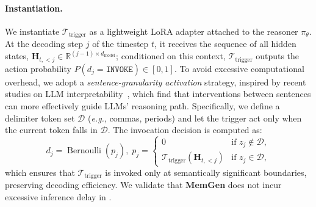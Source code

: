 \documentclass[]{fairmeta}
\newcommand{\ourmethod}{{\fontfamily{lmtt}\selectfont \textbf{MemGen}}\xspace}
\begin{document}
\paragraph{Instantiation.}  
We instantiate $\mathcal{T}_\text{trigger}$ as a lightweight LoRA adapter attached to the reasoner $\pi_\theta$. At the decoding step $j$ of the timestep $t$, it receives the sequence of all hidden states, $\mathbf{H}_{t,<j} \in \mathbb{R}^{(j-1) \times d_\text{model}}$; conditioned on this context, $\mathcal{T}_\text{trigger}$ outputs the action probability $
 P(d_j = \texttt{INVOKE}) \in [0,1].$
To avoid excessive computational overhead, we adopt a \textit{sentence-granularity activation} strategy, inspired by recent studies on LLM interpretability~\citep{transformercircuitsBiologyLarge,chen2024sepllm}, which find that interventions between sentences can more effectively guide LLMs' reasoning path. Specifically, we define a delimiter token set $\mathcal{D}$ (\textit{e.g.}, commas, periods) and let the trigger act only when the current token falls in $\mathcal{D}$. The invocation decision is computed as:
\begin{equation}
d_j = \operatorname{Bernoulli}(p_j), \; p_j =
\begin{cases}
0 & \text{if } z_j \notin \mathcal{D}, \\
\mathcal{T}_\text{trigger}(\mathbf{H}_{t,<j}) & \text{if } z_j \in \mathcal{D},
\end{cases}
\end{equation}
which ensures that $\mathcal{T}_\text{trigger}$ is invoked only at semantically significant boundaries, preserving decoding efficiency. We validate that \ourmethod does not incur excessive inference delay in .

\vspace{-0.8em}
\end{document}

